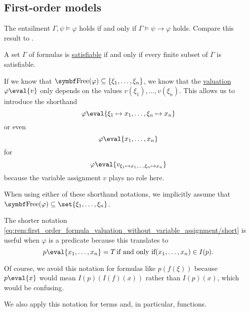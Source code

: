\subsection{First-order models}\label{subsec:first_order_models}

\begin{theorem}\label{thm:semantic_deduction_theorem}\mcite\cite[thm. 14.53]{OpenLogic20201202}
  The entailment \( \Gamma, \psi \vDash \varphi \) holds if and only if \( \Gamma \vDash \psi \to \varphi \) holds. Compare this result to .
\end{theorem}

\begin{theorem}\label{thm:first_order_compactness_theorem}\mcite\cite[thm. 21.21]{OpenLogic20201202}
  A set \( \Gamma \) of formulas is \hyperref[def:propositional_semantics/satisfiability]{satisfiable} if and only if every finite subset of \( \Gamma \) is satisfiable.
\end{theorem}

\begin{remark}\label{rem:first_order_formula_valuation_without_variable_assignment}
  If we know that \( \bfop{Free}(\varphi) \subseteq \{ \xi_1, \ldots, \xi_n \} \), we know that the \hyperref[def:first_order_valuation/formula_valuation]{valuation} \( \varphi\eval{v} \) only depends on the values \( v(\xi_1), \ldots, v(\xi_n) \). This allows us to introduce the shorthand
  \begin{equation}\label{eq:rem:first_order_formula_valuation_without_variable_assignment/long}
    \varphi\eval{\xi_1 \mapsto x_1, \ldots, \xi_n \mapsto x_n}
  \end{equation}
  or even
  \begin{equation}\label{eq:rem:first_order_formula_valuation_without_variable_assignment/short}
    \varphi\eval{x_1, \ldots, x_n}
  \end{equation}
  for
  \begin{equation*}
    \varphi\eval{v_{\xi_1 \mapsto x_1, \ldots, \xi_n \mapsto x_n}}
  \end{equation*}
  because the variable assignment \( v \) plays no role here.

  When using either of these shorthand notations, we implicitly assume that \( \bfop{Free}(\varphi) \subseteq \set{ \xi_1, \ldots, \xi_n } \).

  The shorter notation \eqref{eq:rem:first_order_formula_valuation_without_variable_assignment/short} is useful when \( \varphi \) is a predicate because this translates to
  \begin{equation*}
    p\eval{x_1, \ldots, x_n} = T \T{if and only if} (x_1, \ldots, x_n) \in I(p).
  \end{equation*}

  Of course, we avoid this notation for formulas like \( p(f(\xi)) \) because \( p\eval{x} \) would mean \( I(p)(I(f)(x)) \) rather than \( I(p)(x) \), which would be confusing.

  We also apply this notation for terms and, in particular, functions.
\end{remark}

